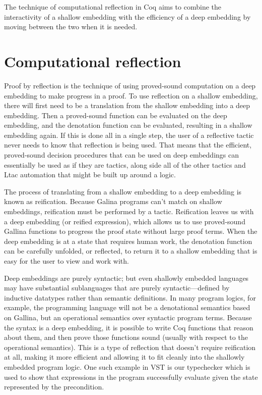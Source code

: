 \documentclass{puthesis}
\begin{document}
The technique of computational reflection in Coq aims to combine the
interactivity of a shallow embedding with the efficiency of a deep
embedding by moving between the two when it is needed.

\section{Computational reflection}
\label{sec:reflection}

Proof by reflection is the technique of using proved-sound computation
on a deep embedding to make progress in a proof. To use reflection on
a shallow embedding, there will first need to be a translation from
the shallow embedding into a deep embedding. Then a proved-sound
function can be evaluated on the deep embedding, and the denotation
function can be evaluated, resulting in a shallow embedding again.  If
this is done all in a single step, the user of a reflective tactic
never needs to know that reflection is being used. That means that the
efficient, proved-sound decision procedures that can be used on deep
embeddings can essentially be used as if they are tactics, along side
all of the other tactics and Ltac automation that might be built up
around a logic.

The process of translating from a shallow embedding to a deep
embedding is known as reification. Because Galina programs can't match on
shallow embeddings, reification must be performed by a
tactic. Reification leaves us with a deep embedding (or reified
expression), which allows us to use proved-sound Gallina functions to
progress the proof state without large proof terms. When the deep
embedding is at a state that requires human work, the denotation
function can be carefully unfolded, or reflected, to return it to a
shallow embedding that is easy for the user to view and work with.


Deep embeddings are purely syntactic; but even shallowly embedded
languages may have substantial sublanguages that are purely
syntactic---defined by inductive datatypes rather than semantic
definitions. In many program logics, for example, the programming
language will not be a denotational semantics based on Gallina, but an
operational semantics over syntactic program terms. Because the syntax
is a deep embedding, it is possible to write Coq functions that reason
about them, and then prove those functions sound (usually with respect
to the operational semantics). This is a type of reflection that
doesn't require reification at all, making it more efficient and
allowing it to fit cleanly into the shallowly embedded program
logic. One such example in VST is our typechecker which is used to
show that expressions in the program successfully evaluate given the
state represented by the precondition.
\end{document}
